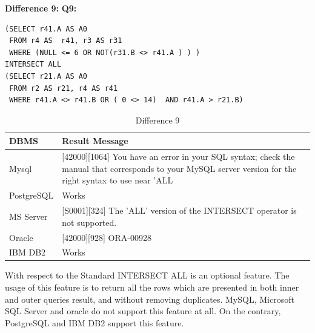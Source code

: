 \hfill\newline\textbf{Difference 9:}
\hfill\newline\textbf{Q9:}

\begin{mdframed}[backgroundcolor=lightgray!20]
\begin{lstlisting}[style=SQL]
(SELECT r41.A AS A0
 FROM r4 AS  r41, r3 AS r31
 WHERE (NULL <= 6 OR NOT(r31.B <> r41.A ) ) )
INTERSECT ALL
(SELECT r21.A AS A0
 FROM r2 AS r21, r4 AS r41
 WHERE r41.A <> r41.B OR ( 0 <> 14)  AND r41.A > r21.B)
\end{lstlisting}
\end{mdframed}

 
\begin{table}[h]
\centering
\caption{Difference 9}
\label{my-label}
\begin{tabular}{|p{2cm}|p{11.5cm}| }
\hline
\textbf{DBMS} & \textbf{Result Message}                                                                                                                                          \\ \hline
Mysql         & {[}42000{]}{[}1064{]} You have an error in your SQL syntax; check the manual that corresponds to your MySQL server version for the right syntax to use near 'ALL \\ \hline
PostgreSQL    & Works                                                                                                                                                            \\ \hline
MS Server     & {[}S0001{]}{[}324{]} The 'ALL' version of the INTERSECT operator is not supported.                                                                               \\ \hline
Oracle        & {[}42000{]}{[}928{]} ORA-00928                                                                                                                                   \\ \hline
IBM DB2       & Works                                                                                                                                                            \\ \hline
\end{tabular}
\end{table}

\hfill\newpage
With respect to the Standard INTERSECT ALL is an optional feature. The usage of this feature is to return all the rows which are presented in both inner and outer queries result, and without removing duplicates. MySQL, Microsoft SQL Server and oracle do not support this feature at all. On the contrary, PostgreSQL and IBM DB2 support this feature. 

